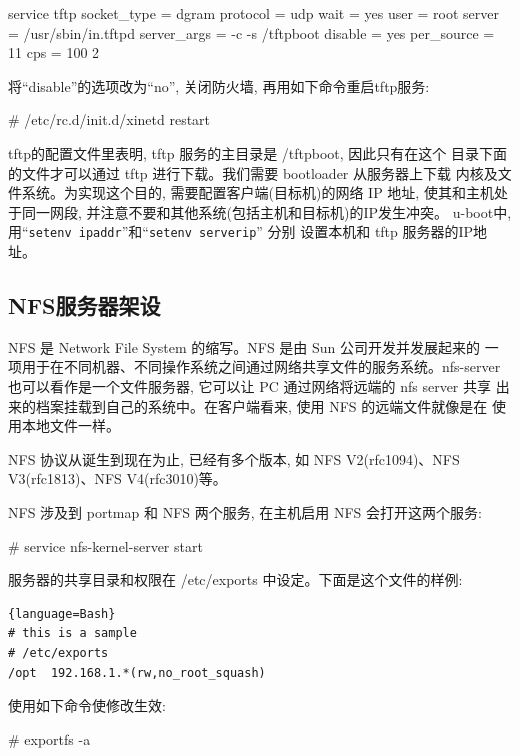 \begin{blockcode}
service tftp
{ 
    socket_type = dgram
    protocol  = udp
    wait = yes
    user = root
    server = /usr/sbin/in.tftpd
    server_args     = -c -s /tftpboot
    disable = yes
    per_source = 11
    cps = 100 2
}
\end{blockcode}

将``disable''的选项改为``no'', 关闭防火墙, 再用如下命令重启tftp服务:

\begin{blockcode}
# /etc/rc.d/init.d/xinetd restart
\end{blockcode}

tftp的配置文件里表明, tftp 服务的主目录是 /tftpboot, 因此只有在这个
目录下面的文件才可以通过 tftp 进行下载。我们需要 bootloader 从服务器上下载
内核及文件系统。为实现这个目的, 需要配置客户端(目标机)的网络 IP 地址,
使其和主机处于同一网段, 并注意不要和其他系统(包括主机和目标机)的IP发生冲突。
u-boot中, 用``\verb|setenv ipaddr|''和``\verb|setenv serverip|'' 分别
设置本机和 tftp 服务器的IP地址。

\subsection{NFS服务器架设}
NFS 是 Network File System 的缩写。NFS 是由 Sun 公司开发并发展起来的
一项用于在不同机器、不同操作系统之间通过网络共享文件的服务系统。nfs-server
也可以看作是一个文件服务器, 它可以让 PC 通过网络将远端的 nfs server 共享
出来的档案挂载到自己的系统中。在客户端看来, 使用 NFS 的远端文件就像是在
使用本地文件一样。

NFS 协议从诞生到现在为止, 已经有多个版本, 如 NFS V2(rfc1094)、NFS
V3(rfc1813)、NFS V4(rfc3010)等。

NFS 涉及到 portmap 和 NFS 两个服务, 在主机启用 NFS 会打开这两个服务:

\begin{blockcode}
# service nfs-kernel-server start
\end{blockcode}

服务器的共享目录和权限在 /etc/exports 中设定。下面是这个文件的样例:

\begin{lstlisting}{language=Bash}
# this is a sample
# /etc/exports
/opt  192.168.1.*(rw,no_root_squash)
\end{lstlisting}

使用如下命令使修改生效:

\begin{blockcode}
# exportfs -a
\end{blockcode}

